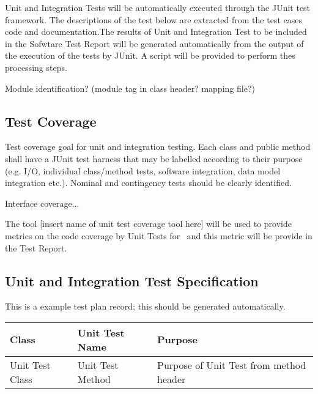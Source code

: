 Unit and Integration Tests will be automatically executed through the JUnit test framework. The descriptions of the test below are extracted from the test cases code and documentation.The results of Unit and Integration Test to be included in the Sofwtare Test Report will be generated automatically from the output of the execution of the tests by JUnit. A script will be provided to perform thes processing steps.

Module identification? (module tag in class header? mapping file?)

\subsection{Test Coverage}

Test coverage goal for unit and integration testing. Each class and public method shall have a JUnit test harness that may be labelled according to their purpose (e.g. I/O, individual class/method tests, software integration, data model integration etc.). Nominal and contingency
tests should be clearly identified.

Interface coverage...

The tool [insert name of unit test coverage tool here] will be used to provide metrics on the code coverage by Unit Tests for \product \ and this metric will be provide in the Test Report.

\subsection{Unit and Integration Test Specification}

This is a example test plan record; this should be generated automatically.

\begin{longtable} {|p{}|p{}|p{}|}\hline
{\bf Class} & {\bf Unit Test Name} & {\bf Purpose}  \\\hline
Unit Test Class &
Unit Test Method &
Purpose of Unit Test from method header \\\hline
\end{longtable}





